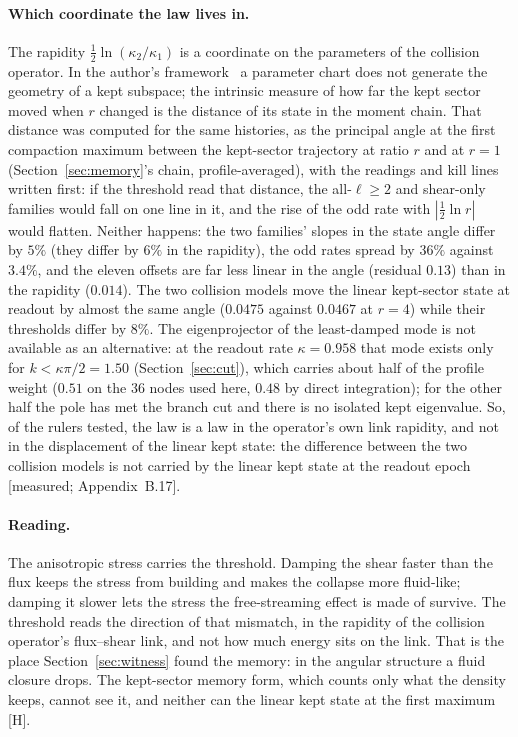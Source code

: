 \documentclass[11pt]{article}
\newcommand{\grade}[1]{\textsf{\small[#1]}}
\begin{document}
\paragraph{Which coordinate the law lives in.} The rapidity $\tfrac12\ln(\kappa_2/\kappa_1)$ is a coordinate on the parameters of the collision operator. In the author's framework~\cite{IQGT} a parameter chart does not generate the geometry of a kept subspace; the intrinsic measure of how far the kept sector moved when $r$ changed is the distance of its state in the moment chain. That distance was computed for the same histories, as the principal angle at the first compaction maximum between the kept-sector trajectory at ratio $r$ and at $r=1$ (Section~\ref{sec:memory}'s chain, profile-averaged), with the readings and kill lines written first: if the threshold read that distance, the all-$\ell\ge2$ and shear-only families would fall on one line in it, and the rise of the odd rate with $|\tfrac12\ln r|$ would flatten. Neither happens: the two families' slopes in the state angle differ by $5\%$ (they differ by $6\%$ in the rapidity), the odd rates spread by $36\%$ against $3.4\%$, and the eleven offsets are far less linear in the angle (residual $0.13$) than in the rapidity ($0.014$). The two collision models move the linear kept-sector state at readout by almost the same angle ($0.0475$ against $0.0467$ at $r=4$) while their thresholds differ by $8\%$. The eigenprojector of the least-damped mode is not available as an alternative: at the readout rate $\kappa=0.958$ that mode exists only for $k<\kappa\pi/2=1.50$ (Section~\ref{sec:cut}), which carries about half of the profile weight ($0.51$ on the $36$ nodes used here, $0.48$ by direct integration); for the other half the pole has met the branch cut and there is no isolated kept eigenvalue. So, of the rulers tested, the law is a law in the operator's own link rapidity, and not in the displacement of the linear kept state: the difference between the two collision models is not carried by the linear kept state at the readout epoch \grade{measured; Appendix~B.17}.

\paragraph{Reading.} The anisotropic stress carries the threshold. Damping the shear faster than the flux keeps the stress from building and makes the collapse more fluid-like; damping it slower lets the stress the free-streaming effect is made of survive. The threshold reads the direction of that mismatch, in the rapidity of the collision operator's flux--shear link, and not how much energy sits on the link. That is the place Section~\ref{sec:witness} found the memory: in the angular structure a fluid closure drops. The kept-sector memory form, which counts only what the density keeps, cannot see it, and neither can the linear kept state at the first maximum \grade{H}.
\end{document}
